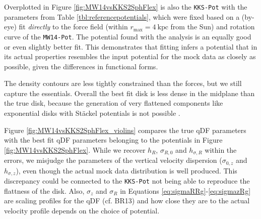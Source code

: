 Overplotted in Figure \ref{fig:MW14vsKKS2SphFlex} is also the \texttt{KKS-Pot} with the parameters from Table \ref{tbl:referencepotentials}, which were fixed based on a (by-eye) fit \emph{directly} to the force field (within $r_\text{max}=4~\text{kpc}$ from the Sun) and rotation curve of the \texttt{MW14-Pot}. The potential found with the \RM{} analysis is an equally good or even slightly better fit. This demonstrates that \RM{} fitting infers a potential that in its actual properties resembles the input potential for the mock data as closely as possible, given the differences in functional forms.

The density contours are less tightly constrained than the forces, but we still capture the essentials. Overall the best fit disk is less dense in the midplane than the true disk, because the generation of very flattened components like exponential disks with St\"{a}ckel potentials is not possible .


Figure \ref{fig:MW14vsKKS2SphFlex_violins} compares the true qDF parameters with the best fit qDF parameters belonging to the potentials in Figure \ref{fig:MW14vsKKS2SphFlex}. While we recover $h_R$, $\sigma_{R,0}$ and $h_{\sigma,R}$ within the errors, we misjudge the parameters of the vertical velocity dispersion ($\sigma_{0,z}$ and $h_{\sigma,z}$), even though the actual mock data distribution is well produced. This discrepancy could be connected to the \texttt{KKS-Pot} not being able to reproduce the flattness of the disk. Also, $\sigma_z$ and $\sigma_R$ in Equations \ref{eq:sigmaRRg}-\ref{eq:sigmazRg} are scaling profiles for the qDF (cf. BR13) and how close they are to the actual velocity profile depends on the choice of potential.










